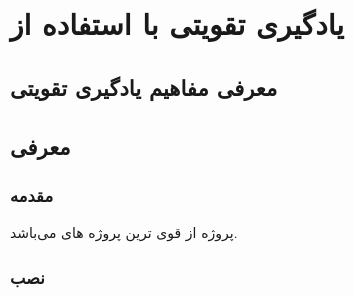 \chapter{یادگیری تقویتی با استفاده از }
\section{معرفی مفاهیم یادگیری تقویتی}

\section{معرفی }
\subsection{مقدمه}
پروژه  از قوی ترین پروژه های
می‌باشد.
\subsection{نصب}















